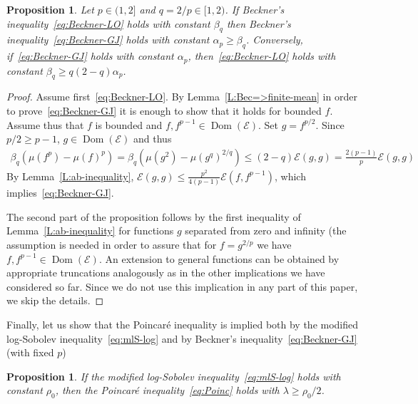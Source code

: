 \documentclass[a4paper]{amsart}
\newtheorem{proposition}[theorem]{Proposition} %
\theoremstyle{definition}
\theoremstyle{remark}
\numberwithin{equation}{section}
\DeclareMathOperator{\Dom}{Dom} %
\newcommand*{\calE}{\mathcal{E}}
\begin{document}
\begin{proposition}
Let $p \in (1,2]$ and $q = 2/p \in [1,2)$.
If Beckner's inequality~\eqref{eq:Beckner-LO} holds with constant $\beta_q$ then Beckner's inequality~\eqref{eq:Beckner-GJ} holds with constant $\alpha_p \ge \beta_q$. Conversely, if~\eqref{eq:Beckner-GJ} holds with constant $\alpha_p$, then~\eqref{eq:Beckner-LO} holds with constant
$\beta_q \ge q(2-q)\alpha_p$.
\end{proposition}

\begin{proof}
  Assume first~\eqref{eq:Beckner-LO}. By Lemma~\ref{L:Bec=>finite-mean} in order to prove~\eqref{eq:Beckner-GJ} it is enough to show that it holds for bounded $f$. Assume thus that $f$ is bounded and $f,f^{p-1} \in \Dom(\calE)$.  Set $g = f^{p/2}$. 
  Since $p/2 \ge p-1$, $g \in \Dom(\calE)$ and thus
  \begin{align*}
    \beta_q(\mu(f^p) - \mu(f)^p) = \beta_q (\mu(g^2) - \mu(g^{q})^{2/q}) \le (2-q)\calE(g,g) = \frac{2(p-1)}{p} \calE(g,g)
  \end{align*}
  By Lemma~\ref{L:ab-inequality}, $\calE(g,g)\le \frac{p^2}{4(p-1)}\calE(f,f^{p-1})$, which implies~\eqref{eq:Beckner-GJ}.

The second part of the proposition follows by the first inequality of Lemma~\ref{L:ab-inequality} for functions $g$ separated from zero and infinity (the assumption is needed in order to assure that for $f = g^{2/p}$ we have $f,f^{p-1} \in \Dom(\calE)$. An extension to general functions can be obtained by appropriate truncations analogously as in the other implications we have considered so far. Since we do not use this implication in any part of this paper, we skip the details.
\end{proof}

Finally, let us show that the Poincar\'e inequality is implied both by the modified log-Sobolev inequality~\eqref{eq:mlS-log} and by Beckner's inequality~\eqref{eq:Beckner-GJ} (with fixed $p$)

\begin{proposition}
\label{prop:mLSI-to-Poinc}
If the modified log-Sobolev inequality~\eqref{eq:mlS-log} holds with constant $\rho_0$, then the Poincar\'e inequality~\eqref{eq:Poinc} holds with $\lambda \ge \rho_0/2$.
\end{proposition}
\end{document}
